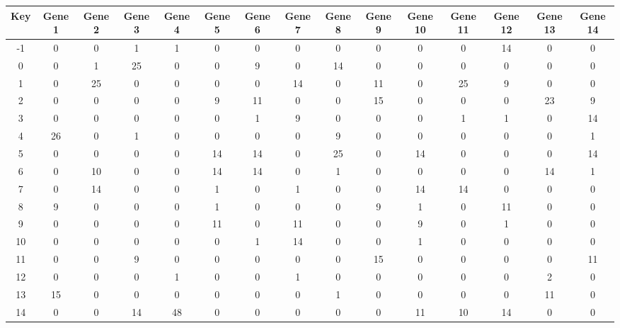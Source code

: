 \begin{tabular}{|c|c|c|c|c|c|c|c|c|c|c|c|c|c|c|}
\hline
Key & Gene 1 & Gene 2 & Gene 3 & Gene 4 & Gene 5 & Gene 6 & Gene 7 & Gene 8 & Gene 9 & Gene 10 & Gene 11 & Gene 12 & Gene 13 & Gene 14 \\
\hline
-1 & 0 & 0 & 1 & 1 & 0 & 0 & 0 & 0 & 0 & 0 & 0 & 14 & 0 & 0 \\
0 & 0 & 1 & 25 & 0 & 0 & 9 & 0 & 14 & 0 & 0 & 0 & 0 & 0 & 0 \\
1 & 0 & 25 & 0 & 0 & 0 & 0 & 14 & 0 & 11 & 0 & 25 & 9 & 0 & 0 \\
2 & 0 & 0 & 0 & 0 & 9 & 11 & 0 & 0 & 15 & 0 & 0 & 0 & 23 & 9 \\
3 & 0 & 0 & 0 & 0 & 0 & 1 & 9 & 0 & 0 & 0 & 1 & 1 & 0 & 14 \\
4 & 26 & 0 & 1 & 0 & 0 & 0 & 0 & 9 & 0 & 0 & 0 & 0 & 0 & 1 \\
5 & 0 & 0 & 0 & 0 & 14 & 14 & 0 & 25 & 0 & 14 & 0 & 0 & 0 & 14 \\
6 & 0 & 10 & 0 & 0 & 14 & 14 & 0 & 1 & 0 & 0 & 0 & 0 & 14 & 1 \\
7 & 0 & 14 & 0 & 0 & 1 & 0 & 1 & 0 & 0 & 14 & 14 & 0 & 0 & 0 \\
8 & 9 & 0 & 0 & 0 & 1 & 0 & 0 & 0 & 9 & 1 & 0 & 11 & 0 & 0 \\
9 & 0 & 0 & 0 & 0 & 11 & 0 & 11 & 0 & 0 & 9 & 0 & 1 & 0 & 0 \\
10 & 0 & 0 & 0 & 0 & 0 & 1 & 14 & 0 & 0 & 1 & 0 & 0 & 0 & 0 \\
11 & 0 & 0 & 9 & 0 & 0 & 0 & 0 & 0 & 15 & 0 & 0 & 0 & 0 & 11 \\
12 & 0 & 0 & 0 & 1 & 0 & 0 & 1 & 0 & 0 & 0 & 0 & 0 & 2 & 0 \\
13 & 15 & 0 & 0 & 0 & 0 & 0 & 0 & 1 & 0 & 0 & 0 & 0 & 11 & 0 \\
14 & 0 & 0 & 14 & 48 & 0 & 0 & 0 & 0 & 0 & 11 & 10 & 14 & 0 & 0 \\
\hline
\end{tabular}